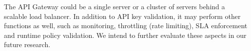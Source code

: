 The API Gateway could be a single server or a cluster of servers behind a scalable load balancer. %
In addition to API key validation, it may perform other
functions as well, such as monitoring, throttling (rate limiting), SLA enforcement and runtime policy validation. We intend to further evaluate these aspects
in our future research.